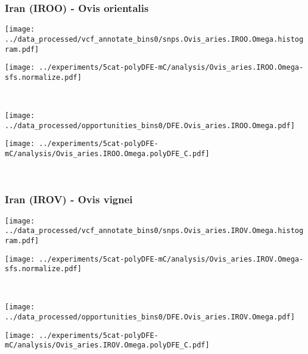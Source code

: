 \subsubsection{Iran (IROO) - Ovis orientalis}

\begin{minipage}{0.49\linewidth}
    \texttt{[image: ../data\_processed/vcf\_annotate\_bins0/snps.Ovis\_aries.IROO.Omega.histogram.pdf]}
\end{minipage}
\begin{minipage}{0.49\linewidth}
    \texttt{[image: ../experiments/5cat-polyDFE-mC/analysis/Ovis\_aries.IROO.Omega-sfs.normalize.pdf]}
\end{minipage}
\\
\begin{minipage}{0.49\linewidth}
    \texttt{[image: ../data\_processed/opportunities\_bins0/DFE.Ovis\_aries.IROO.Omega.pdf]}
\end{minipage}
\begin{minipage}{0.49\linewidth}
    \texttt{[image: ../experiments/5cat-polyDFE-mC/analysis/Ovis\_aries.IROO.Omega.polyDFE\_C.pdf]}
\end{minipage}
\\

\subsubsection{Iran (IROV) - Ovis vignei}

\begin{minipage}{0.49\linewidth}
    \texttt{[image: ../data\_processed/vcf\_annotate\_bins0/snps.Ovis\_aries.IROV.Omega.histogram.pdf]}
\end{minipage}
\begin{minipage}{0.49\linewidth}
    \texttt{[image: ../experiments/5cat-polyDFE-mC/analysis/Ovis\_aries.IROV.Omega-sfs.normalize.pdf]}
\end{minipage}
\\
\begin{minipage}{0.49\linewidth}
    \texttt{[image: ../data\_processed/opportunities\_bins0/DFE.Ovis\_aries.IROV.Omega.pdf]}
\end{minipage}
\begin{minipage}{0.49\linewidth}
    \texttt{[image: ../experiments/5cat-polyDFE-mC/analysis/Ovis\_aries.IROV.Omega.polyDFE\_C.pdf]}
\end{minipage}
\\

